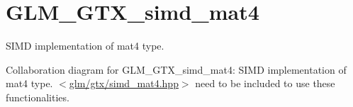 \hypertarget{group__gtx__simd__mat4}{\section{G\-L\-M\-\_\-\-G\-T\-X\-\_\-simd\-\_\-mat4}
\label{group__gtx__simd__mat4}
}


S\-I\-M\-D implementation of mat4 type.  


Collaboration diagram for G\-L\-M\-\_\-\-G\-T\-X\-\_\-simd\-\_\-mat4\-:
S\-I\-M\-D implementation of mat4 type. $<$\hyperlink{simd__mat4_8hpp}{glm/gtx/simd\-\_\-mat4.\-hpp}$>$ need to be included to use these functionalities. 